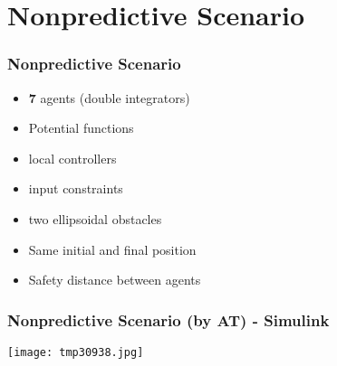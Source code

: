 \section{Nonpredictive Scenario}
\begin{frame}	\frametitle{Nonpredictive Scenario}
	\begin{itemize}
		\item \textbf{7} agents (double integrators)
		\item Potential functions
 		\item local controllers
 		\item input constraints
 		\item two ellipsoidal obstacles
 		\item Same initial and final position
 		\item Safety distance between agents
	\end{itemize}
\end{frame}	

\begin{frame}	\frametitle{Nonpredictive Scenario (by AT) - Simulink}
		\centering
		\texttt{[image: tmp30938.jpg]}
\end{frame}